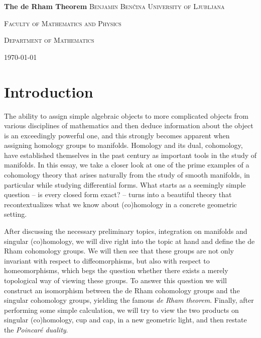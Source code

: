 \documentclass[a4paper, 12pt]{article}
\begin{document}
\begin{titlepage}
\centering
\textbf{\Huge{The de Rham Theorem}}
\vfill\vfill
\textsc{\Large{Benjamin Benčina}}
\vfill\vfill
\textsc{\large{University of Ljubljana}}

\textsc{\large{Faculty of Mathematics and Physics}}

\textsc{\large{Department of Mathematics}}
\vfill\vfill\vfill

{\large\today}

\end{titlepage}

\tableofcontents
\newpage

\section{Introduction}

The ability to assign simple algebraic objects to more complicated objects from
various disciplines of mathematics and then deduce information about the object
is an exceedingly powerful one, and this strongly becomes apparent when
assigning homology groups to manifolds.  Homology and its dual, cohomology,
have established themselves in the past century as important tools in the study
of manifolds.  In this essay, we take a closer look at one of the prime
examples of a cohomology theory that arises naturally from the study of smooth
manifolds, in particular while studying differential forms.  What starts as a
seemingly simple question -- is every closed form exact? -- turns into a
beautiful theory that recontextualizes what we know about (co)homology in a
concrete geometric setting.

After discussing the necessary preliminary topics, integration on manifolds and
singular (co)homology, we will dive right into the topic at hand and define the
de Rham cohomology groups.  We will then see that these groups are not only
invariant with respect to diffeomorphisms, but also with respect to
homeomorphisms, which begs the question whether there exists a merely
topological way of viewing these groups.  To answer this question we will
construct an isomorphism between the de Rham cohomology groups and the singular
cohomology groups, yielding the famous \emph{de Rham theorem}.  Finally, after
performing some simple calculation, we will try to view the two products on
singular (co)homology, cup and cap, in a new geometric light, and then restate
the \emph{Poincar\'e duality}.
\end{document}
